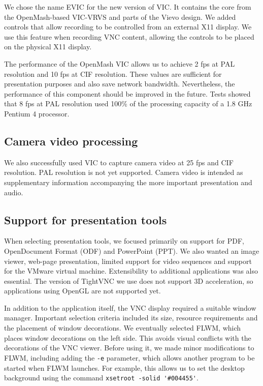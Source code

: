 We chose the name EVIC for the new version of VIC. It contains the core from the OpenMash-based VIC-VRVS and parts of the Vievo design. We added controls that allow recording to be controlled from an external X11 display. We use this feature when recording VNC content, allowing the controls to be placed on the physical X11 display.

The performance of the OpenMash VIC allows us to achieve 2 fps at PAL resolution and 10 fps at CIF resolution. These values are sufficient for presentation purposes and also save network bandwidth. Nevertheless, the performance of this component should be improved in the future. Tests showed that 8 fps at PAL resolution used 100\% of the processing capacity of a 1.8 GHz Pentium 4 processor.

\subsection{Camera video processing}

We also successfully used VIC to capture camera video at 25 fps and CIF resolution. PAL resolution is not yet supported. Camera video is intended as supplementary information accompanying the more important presentation and audio.

\subsection{Support for presentation tools}

When selecting presentation tools, we focused primarily on support for PDF, OpenDocument Format (ODF) and PowerPoint (PPT). We also wanted an image viewer, web-page presentation, limited support for video sequences and support for the VMware virtual machine. Extensibility to additional applications was also essential. The version of TightVNC we use does not support 3D acceleration, so applications using OpenGL are not supported yet.

In addition to the application itself, the VNC display required a suitable window manager. Important selection criteria included its size, resource requirements and the placement of window decorations. We eventually selected FLWM, which places window decorations on the left side. This avoids visual conflicts with the decorations of the VNC viewer. Before using it, we made minor modifications to FLWM, including adding the \verb|-e| parameter, which allows another program to be started when FLWM launches. For example, this allows us to set the desktop background using the command \verb|xsetroot -solid '#004455'|.

